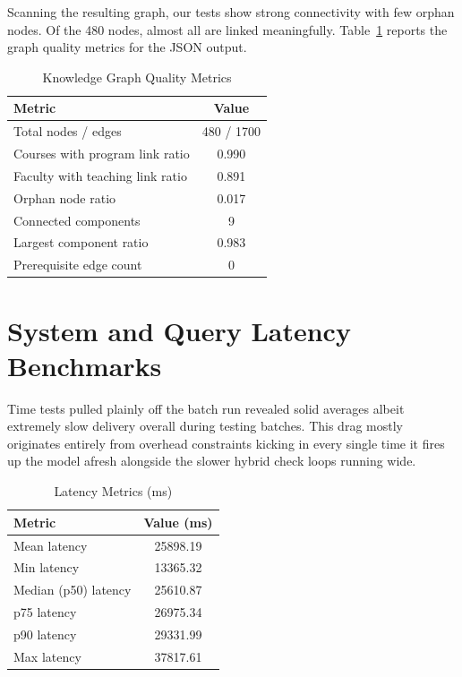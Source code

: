 \documentclass[12pt,a4paper]{report}
\begin{document}
Scanning the resulting graph, our tests show strong connectivity with few orphan nodes. Of the 480 nodes, almost all are linked meaningfully. Table~\ref{tab:kg_quality} reports the graph quality metrics for the JSON output.

\begin{table}[htbp]
  \centering
    \vspace*{5pt}
  \begin{tabular}{|l|c|}
    \hline
    \textbf{Metric} & \textbf{Value} \\ \hline
    Total nodes / edges & 480 / 1700 \\ \hline
    Courses with program link ratio & 0.990 \\ \hline
    Faculty with teaching link ratio & 0.891 \\ \hline
    Orphan node ratio & 0.017 \\ \hline
    Connected components & 9 \\ \hline
    Largest component ratio & 0.983 \\ \hline
    Prerequisite edge count & 0 \\ \hline
  \end{tabular}
  \caption{Knowledge Graph Quality Metrics}
  \label{tab:kg_quality}

\end{table}

\section{System and Query Latency Benchmarks}

Time tests pulled plainly off the batch run revealed solid averages albeit extremely slow delivery overall during testing batches. This drag mostly originates entirely from overhead constraints kicking in every single time it fires up the model afresh alongside the slower hybrid check loops running wide.

\begin{table}[htbp]
  \centering
    \vspace*{5pt}
  \begin{tabular}{|l|c|}
    \hline
    \textbf{Metric} & \textbf{Value (ms)} \\ \hline
    Mean latency & 25898.19 \\ \hline
    Min latency & 13365.32 \\ \hline
    Median (p50) latency & 25610.87 \\ \hline
    p75 latency & 26975.34 \\ \hline
    p90 latency & 29331.99 \\ \hline
    Max latency & 37817.61 \\ \hline
  \end{tabular}
  \caption{Latency Metrics (ms)}
  \label{tab:latency_metrics}

\end{table}
\end{document}
